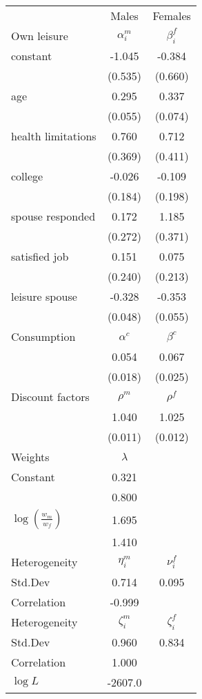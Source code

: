 \begin{tabular}{lcc} 
\hline\hline 
 & Males & Females \\ 
Own leisure & $\alpha_{i}^{m}$ & $\beta_{i}^{f}$ \\ 
constant & -1.045 & -0.384 \\ 
 & (0.535) & (0.660) \\ 
age & 0.295 & 0.337 \\ 
 & (0.055) & (0.074) \\ 
health limitations & 0.760 & 0.712 \\ 
 & (0.369) & (0.411) \\ 
college & -0.026 & -0.109 \\ 
 & (0.184) & (0.198) \\ 
spouse responded & 0.172 & 1.185 \\ 
 & (0.272) & (0.371) \\ 
satisfied job & 0.151 & 0.075 \\ 
 & (0.240) & (0.213) \\ 
leisure spouse & -0.328 & -0.353 \\ 
 & (0.048) & (0.055) \\ 
Consumption & $\alpha^{c}$ & $\beta^{c}$ \\ 
 & 0.054 & 0.067 \\ 
 & (0.018) & (0.025) \\ 
Discount factors & $\rho^m$ & $\rho^f$ \\ 
 & 1.040 & 1.025 \\ 
 & (0.011) & (0.012) \\ 
Weights & $\lambda$ &  \\ 
Constant & 0.321 &  \\ 
 & 0.800 &  \\ 
$\log(\frac{w_m}{w_f})$ & 1.695 &  \\ 
 & 1.410 &  \\ 
Heterogeneity & $\eta_i^m$ & $\nu_i^f$ \\ 
Std.Dev & 0.714 & 0.095 \\ 
Correlation & -0.999 &  \\ 
Heterogeneity & $\zeta_i^m$ & $\zeta_i^f$ \\ 
Std.Dev & 0.960 & 0.834 \\ 
Correlation & 1.000 &  \\ 
\hline 
$\log L$ & -2607.0 & \\ 
\hline \hline 
\end{tabular} 
